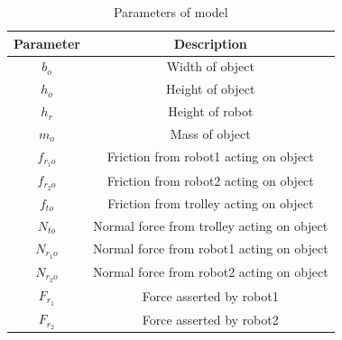 \begin{table}[tb]
\caption{Parameters of model}
\centering
\begin{tabular}{c|c}
\hline
Parameter & Description                   \\ \hline\hline
$b_o$       & Width of object              \\ \hline
$h_o$      & Height of object               \\ \hline
$h_r$      & Height of robot               \\ \hline
$m_o$     & Mass of object        \\ \hline
$f_{r_1 o}$       & Friction from robot1 acting on object                 \\ \hline
$f_{r_2 o}$ & Friction from robot2 acting on object                 \\ \hline
$f_{t o}$ & Friction from trolley acting on object                 \\ \hline
$N_{t o}$ & Normal force from trolley acting on object                 \\ \hline
$N_{r_1 o}$ & Normal force from robot1 acting on object                 \\ \hline
$N_{r_2 o}$ & Normal force from robot2 acting on object                 \\ \hline
$F_{r_1}$ & Force asserted by robot1                 \\ \hline
$F_{r_2}$ & Force asserted by robot2                 \\ \hline
\end{tabular}
\label{tab:model-parameter}
\end{table}

